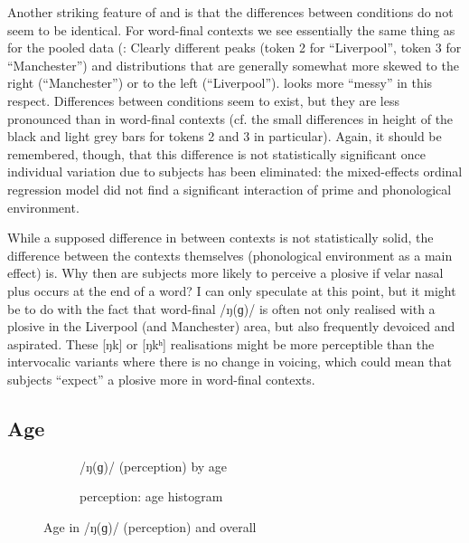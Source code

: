 Another striking feature of  and  is that the differences between  conditions do not seem to be identical.
For word-final contexts we see essentially the same thing as for the pooled data (: Clearly different peaks (token 2 for ``Liverpool'', token 3 for ``Manchester'') and distributions that are generally somewhat more skewed to the right (``Manchester'') or to the left (``Liverpool'').
 looks more ``messy'' in this respect.
Differences between  conditions seem to exist, but they are less pronounced than in word-final contexts (cf. the small differences in height of the black and light grey bars for tokens 2 and 3 in particular).
Again, it should be remembered, though, that this difference is not statistically significant once individual variation due to subjects has been eliminated: the mixed-effects ordinal regression model did not find a significant interaction of prime and phonological environment.

While a supposed difference in  between contexts is not statistically solid, the difference between the contexts themselves (phonological environment as a main effect) is.
Why then are subjects more likely to perceive a plosive if velar nasal plus occurs at the end of a word?
I can only speculate at this point, but it might be to do with the fact that word-final /ŋ(ɡ)/ is often not only realised with a plosive in the Liverpool (and Manchester) area, but also frequently devoiced and aspirated.
These [ŋk] or [ŋkʰ] realisations might be more perceptible than the intervocalic variants where there is no change in voicing, which could mean that subjects ``expect'' a plosive more in word-final contexts.

\subsection{Age}
\label{sec.perc_res.ng.age}

\begin{figure}[b]
	
	\begin{subfigure}{.49\textwidth}
		
			\resizebox{\linewidth}{!}{} 
		\caption{/ŋ(ɡ)/ (perception)  by age}
		\label{fig.scatter.ng.ext.age}
	\end{subfigure}
	\begin{subfigure}{.49\textwidth}
		
			\resizebox{\linewidth}{!}{} 
		\caption{perception: age histogram}
		\label{fig.hist.ext.age}
	\end{subfigure}			
	\caption{Age in /ŋ(ɡ)/ (perception) and overall}
\end{figure}

